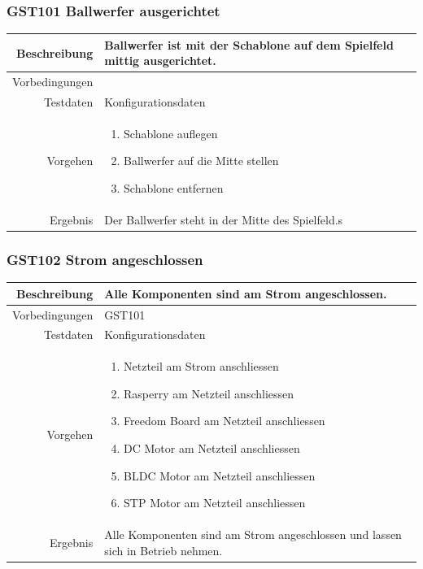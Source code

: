 \subsubsection{GST101 Ballwerfer ausgerichtet}
\begin{table}[h!]
	\renewcommand{\arraystretch}{1.5}
	\begin{tabular}{|r|p{14cm}|}
		\hline Beschreibung & Ballwerfer ist mit der Schablone auf dem Spielfeld mittig ausgerichtet. \\ 
		\hline Vorbedingungen &  \\ 
		\hline Testdaten & Konfigurationsdaten \\ 
		\hline Vorgehen & 
		\begin{enumerate}
			\item Schablone auflegen
			\item Ballwerfer auf die Mitte stellen
			\item Schablone entfernen
		\end{enumerate} \\ 
		\hline Ergebnis & Der Ballwerfer steht in der Mitte des Spielfeld.s \\ 
		\hline 
	\end{tabular}
\end{table}

\subsubsection{GST102 Strom angeschlossen}
\begin{table}[h!]
	\renewcommand{\arraystretch}{1.5}
	\begin{tabular}{|r|p{14cm}|}
		\hline Beschreibung & Alle Komponenten sind am Strom angeschlossen. \\ 
		\hline Vorbedingungen &  GST101\\ 
		\hline Testdaten & Konfigurationsdaten \\ 
		\hline Vorgehen & 
		\begin{enumerate}
			\item Netzteil am Strom anschliessen
			\item Rasperry am Netzteil anschliessen
			\item Freedom Board am Netzteil anschliessen
			\item DC Motor am Netzteil anschliessen
			\item BLDC Motor am Netzteil anschliessen
			\item STP Motor am Netzteil anschliessen
		\end{enumerate} \\ 
		\hline Ergebnis & Alle Komponenten sind am Strom angeschlossen und lassen sich in Betrieb nehmen. \\ 
		\hline 
	\end{tabular}
\end{table}
\newpage

